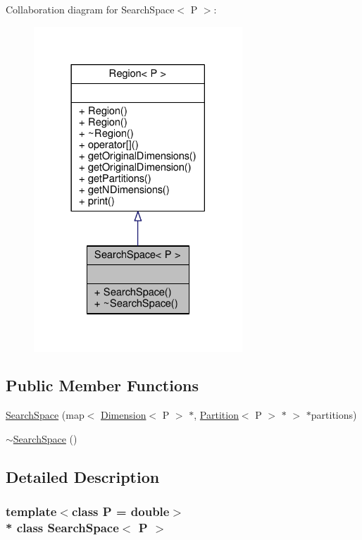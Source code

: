 Collaboration diagram for Search\+Space$<$ P $>$\+:
\nopagebreak
\begin{figure}[H]
\begin{center}
\leavevmode
\includegraphics[width=222pt]{classSearchSpace__coll__graph}
\end{center}
\end{figure}
\subsection*{Public Member Functions}
\begin{DoxyCompactItemize}
\item 
\hyperlink{classSearchSpace_a6730e3f4bc5237f1ac1ba779f3d93bff}{Search\+Space} (map$<$ \hyperlink{classDimension}{Dimension}$<$ P $>$ $\ast$, \hyperlink{classPartition}{Partition}$<$ P $>$ $\ast$ $>$ $\ast$partitions)
\item 
\hyperlink{classSearchSpace_a2951e3838e24ad16a0222b87f8564ab0}{$\sim$\+Search\+Space} ()
\end{DoxyCompactItemize}


\subsection{Detailed Description}
\subsubsection*{template$<$class P = double$>$\\*
class Search\+Space$<$ P $>$}

